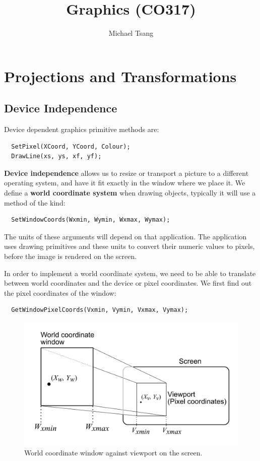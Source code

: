 \documentclass[11pt]{article}
\title{Graphics (CO317)}
\author{Michael Tsang}
\begin{document}
\maketitle

\section{Projections and Transformations}
\subsection{Device Independence}
Device dependent graphics primitive methods are:
\begin{verbatim}
  SetPixel(XCoord, YCoord, Colour);
  DrawLine(xs, ys, xf, yf);
\end{verbatim}

\textbf{Device independence} allows us to resize or transport a picture to a different operating system, and have it fit exactly in the window where we place it.
We define a \textbf{world coordinate system} when drawing objects, typically it will use a method of the kind:
\begin{verbatim}
  SetWindowCoords(Wxmin, Wymin, Wxmax, Wymax);
\end{verbatim}

The units of these arguments will depend on that application.
The application uses drawing primitives and these units to convert their numeric values to pixels, before the image is rendered on the screen.

In order to implement a world coordinate system, we need to be able to translate between world coordinates and the device or pixel coordinates.
We first find out the pixel coordinates of the window:
\begin{verbatim}
  GetWindowPixelCoords(Vxmin, Vymin, Vxmax, Vymax);
\end{verbatim}

\begin{figure}[h]
  \caption{World coordinate window against viewport on the screen.}
  \includegraphics[scale=0.4]{normalisation}
  \centering
\end{figure}
\end{document}
